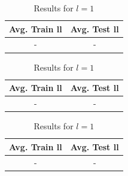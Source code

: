 \documentclass[english]{article}
\providecommand{\tabularnewline}{\\}
\begin{document}
\begin{table}
\centering{}%
\begin{minipage}[t]{0.3\textwidth}%
\begin{center}
\begin{tabular}{c|c}
\textbf{Avg. Train ll} & \textbf{Avg. Test ll}\tabularnewline
\hline 
- & -\tabularnewline
\hline 
\end{tabular}\caption{Results for $l=0.01$\label{tab:avg_ll_l_001}}
\par\end{center}%
\end{minipage}\hspace{0.5cm}%
\begin{minipage}[t]{0.3\textwidth}%
\begin{center}
\begin{tabular}{c|c}
\textbf{Avg. Train ll} & \textbf{Avg. Test ll}\tabularnewline
\hline 
- & -\tabularnewline
\hline 
\end{tabular}\caption{Results for $l=0.1$\label{tab:avg_ll_l_01}}
\par\end{center}%
\end{minipage}\hspace{0.5cm}%
\begin{minipage}[t]{0.3\textwidth}%
\begin{center}
\begin{tabular}{c|c}
\textbf{Avg. Train ll} & \textbf{Avg. Test ll}\tabularnewline
\hline 
- & -\tabularnewline
\hline 
\end{tabular}\caption{Results for $l=1$\label{tab:avg_ll_l_1}}
\par\end{center}%
\end{minipage}
\end{table}
\end{document}
